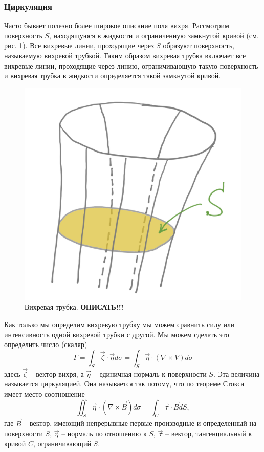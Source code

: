 {\color{done}\subsubsection{Циркуляция}}
Часто бывает полезно более широкое описание поля вихря. Рассмотрим поверхность $S$, находящуюся в жидкости и ограниченную замкнутой кривой (см. рис. \ref{fig:ch10.5}). Все вихревые линии, проходящие через $S$ образуют поверхность, называемую вихревой трубкой. Таким образом вихревая трубка включает все вихревые линии, проходящие через линию, ограничивающую такую поверхность и вихревая трубка в жидкости определяется такой замкнутой кривой. 
    \begin{figure}[h]
    \centering
    \includegraphics[width=0.5\linewidth]{pics/ch10.5.png}
    \caption{\label{fig:ch10.5}
    {\color{red} Вихревая трубка. \textbf{ОПИСАТЬ!!! }}
    }
    \end{figure}    
Как только мы определим вихревую трубку мы можем сравнить силу или интенсивность одной вихревой трубки с другой. Мы можем сделать это определить число (скаляр)
\begin{equation}
    \label{eq:ch10-gamma}
    \Gamma=\int_S\vec{\zeta}\cdot\vec{\eta} d\sigma=\int_S \vec{\eta}\cdot(\nabla\times V)d\sigma
\end{equation}
здесь $\vec{\zeta}$ -- вектор вихря, а $\vec{\eta}$ -- единичная нормаль к поверхности $S$. Эта величина называется циркуляцией. Она называется так потому, что по теореме Стокса имеет место соотношение
\begin{equation}
    \label{eq:ch10-stoks}
    \iint_S \vec{\eta}\cdot(\nabla\times\vec{B})d\sigma = \int_C\vec{\tau}\cdot \vec{B} dS,
\end{equation}
где $\vec{B}$ -- вектор, имеющий непрерывные первые производные и определенный на поверхности $S$, $\vec{\eta}$ -- нормаль по отношению к $S$, $\vec{\tau}$ -- вектор, тангенциальный к кривой $C$, ограничивающий $S$.

